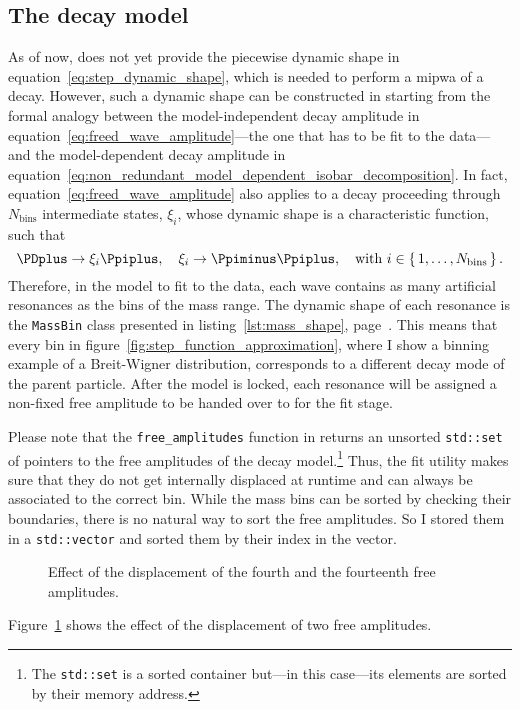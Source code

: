 \subsection{The decay model}

    As of now,  does not yet provide the piecewise dynamic shape in equation~\eqref{eq:step_dynamic_shape}, which is needed to perform a \ac{mipwa} of a decay.
    However, such a dynamic shape can be constructed in  starting from the formal analogy between the model-independent decay amplitude in equation~\eqref{eq:freed_wave_amplitude}---the one that has to be fit to the data---and the model-dependent decay amplitude in equation~\eqref{eq:non_redundant_model_dependent_isobar_decomposition}.
    In fact, equation~\eqref{eq:freed_wave_amplitude} also applies to a decay proceeding through $N_\text{bins}$ intermediate states, $\xi_i$, whose dynamic shape is a characteristic function, such that
    \begin{equation}
        \PDplus\to\xi_i\Ppiplus,\quad%
        \xi_i\to\Ppiminus\Ppiplus,\quad
        \text{with } i \in \set{1,\dots, N_{\text{bins}}}.
    \end{equation}
    Therefore, in the model to fit to the data, each wave contains as many artificial resonances as the bins of the mass range.
    The dynamic shape of each resonance is the \lstinline!MassBin! class presented in listing~\ref{lst:mass_shape}, page~\pageref{lst:mass_shape}.
    This means that every bin in figure~\ref{fig:step_function_approximation}, where I show a binning example of a Breit-Wigner distribution, corresponds to a different decay mode of the parent particle.
    After the model is locked, each resonance will be assigned a non-fixed free amplitude to be handed over to  for the fit stage.


    Please note that the \lstinline!free_amplitudes! function in  returns an unsorted \lstinline!std::set! of pointers to the free amplitudes of the decay model.\footnote{The \lstinline!std::set! is a sorted container but---in this case---its elements are sorted by their memory address.}
    Thus, the fit utility makes sure that they do not get internally displaced at runtime and can always be associated to the correct bin.
    While the mass bins can be sorted by checking their boundaries, there is no natural way to sort the free amplitudes.
    So I stored them in a \lstinline!std::vector! and sorted them by their index in the vector.
    \begin{figure}
        \centering
        \subfloat[][]{}

        \subfloat[][]{}

        \caption{Effect of the displacement of the fourth and the fourteenth free amplitudes.}
        \label{fig:bw_binning_displaced}
    \end{figure}
    Figure~\ref{fig:bw_binning_displaced} shows the effect of the displacement of two free amplitudes.


